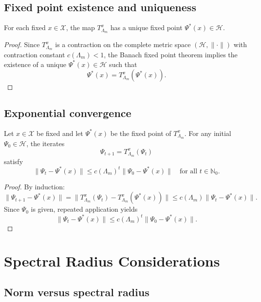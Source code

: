 \documentclass[11pt]{article}
\begin{document}
\subsection{Fixed point existence and uniqueness}

\begin{lemma}
For each fixed $x \in \mathcal{X}$, the map $T_{\Lambda_m}^x$ has a unique fixed point $\Psi^\ast(x) \in \mathcal{H}$.
\end{lemma}

\begin{proof}
Since $T_{\Lambda_m}^x$ is a contraction on the complete metric space $(\mathcal{H},\|\cdot\|)$ with contraction constant $c(\Lambda_m) < 1$, the Banach fixed point theorem implies the existence of a unique $\Psi^\ast(x) \in \mathcal{H}$ such that
\[
  \Psi^\ast(x) = T_{\Lambda_m}^x(\Psi^\ast(x)).
\]
\end{proof}

\subsection{Exponential convergence}

\begin{lemma}
Let $x \in \mathcal{X}$ be fixed and let $\Psi^\ast(x)$ be the fixed point of $T_{\Lambda_m}^x$. For any initial $\Psi_0 \in \mathcal{H}$, the iterates
\[
  \Psi_{t+1} = T_{\Lambda_m}^x(\Psi_t)
\]
satisfy
\[
  \|\Psi_t - \Psi^\ast(x)\|
  \leq
  c(\Lambda_m)^t \|\Psi_0 - \Psi^\ast(x)\|
  \quad \text{for all } t \in \mathbb{N}_0.
\]
\end{lemma}

\begin{proof}
By induction:
\[
  \|\Psi_{t+1} - \Psi^\ast(x)\|
  =
  \|T_{\Lambda_m}^x(\Psi_t) - T_{\Lambda_m}^x(\Psi^\ast(x))\|
  \leq
  c(\Lambda_m)\|\Psi_t - \Psi^\ast(x)\|.
\]
Since $\Psi_0$ is given, repeated application yields
\[
  \|\Psi_t - \Psi^\ast(x)\|
  \leq
  c(\Lambda_m)^t \|\Psi_0 - \Psi^\ast(x)\|.
\]
\end{proof}

\section{Spectral Radius Considerations}

\subsection{Norm versus spectral radius}
\end{document}
